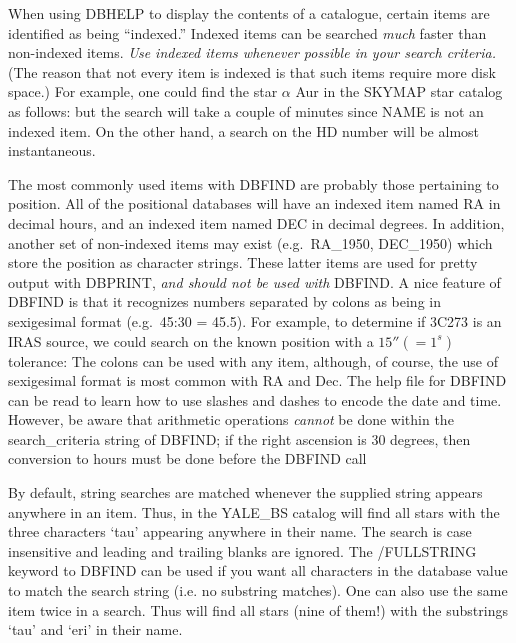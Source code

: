 When using DBHELP to display the contents of a catalogue, certain items are
identified as being ``indexed.''  Indexed items can be searched {\em much} 
faster than non-indexed items. 
{\em Use indexed items whenever possible in your search criteria.}   
(The reason that not every item is indexed is that such items require more disk
space.)
For example, one could find
the star $\alpha$ Aur in the SKYMAP star catalog as follows:
\exbegin
{}
\exend
but the search will take a couple of  minutes since NAME is not an indexed
item.  On the other hand, a search on the HD number will be almost
instantaneous.
\exbegin
{}
\exend 

The most commonly used items with DBFIND are probably those 
pertaining to position.
All of the positional databases will have an indexed item named RA in decimal
hours, and an indexed item named DEC in decimal degrees.  In addition, another
set of non-indexed items may exist (e.g.\ RA\_1950, DEC\_1950) which store
the position as character strings.  These latter items are used for pretty
output with DBPRINT, {\em and should not be used with} DBFIND.  A nice
feature of DBFIND is that it recognizes numbers separated by colons as being
in sexigesimal format (e.g.\  45:30 = 45.5).
For example, to determine if 3C273 is an IRAS source, we could search on the
known position with a $15'' (=1^s)$ tolerance:
\exbegin
{}
\exend
The colons can be used with any item, although, of course, the use of 
sexigesimal format is most common with RA and Dec.   The help file for
DBFIND can be read to learn how to use slashes and dashes to encode the
date and time.  However, be aware that arithmetic operations {\em cannot}
be done within the search\_criteria string of DBFIND; if the right ascension
is 30 degrees, then conversion to hours must be done before the DBFIND call
\exbegin
{}
\exend

By default, string searches are matched whenever the supplied string appears anywhere in
an item.   Thus, in the YALE\_BS catalog
will find all stars with the three characters `tau' appearing anywhere in
their name.    The search is case insensitive and leading and trailing blanks 
are ignored.   The /FULLSTRING keyword to DBFIND can be used if you want all
characters in the database value to match the search string (i.e. no substring
matches).  One can also use the same item twice in a search.   Thus
will find all stars (nine of them!) with the substrings `tau' and `eri' in
their name.

